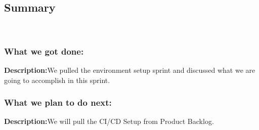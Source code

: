 \documentclass[a4paper]{article}
\begin{document}
\subsection{Summary}
\\
\subsubsection{What we got done:}
\textbf{Description:}We pulled the environment setup sprint and discussed what we are going to accomplish in this sprint. \\

\subsubsection{What we plan to do next:}
\textbf{Description:}We will pull the CI/CD Setup from Product Backlog. \\
\end{document}
